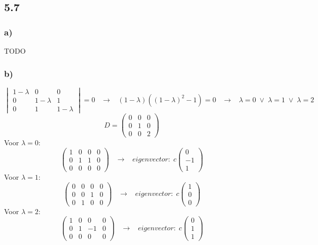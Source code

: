 \documentclass[11pt]{article}
\begin{document}
\subsection*{5.7}
\subsubsection*{a)}
TODO

\subsubsection*{b)}
\[
\begin{vmatrix}
1-\lambda & 0 & 0\\
0 & 1- \lambda & 1 \\
0 & 1 & 1-\lambda
\end{vmatrix}
=0
\;\;\;\longrightarrow\;\;\;
(1-\lambda)((1-\lambda)^2-1)=0
\;\;\;\longrightarrow\;\;\;
\lambda = 0 \;\vee\; \lambda = 1 \;\vee\; \lambda = 2
\]
\[
D = 
\begin{pmatrix}
0 & 0 & 0\\
0 & 1 & 0\\
0 & 0 & 2
\end{pmatrix}
\]
Voor $\lambda = 0$: 
\[
\left(
\begin{array}{ccc|c}
1 & 0 & 0 & 0\\
0 & 1 & 1 & 0\\
0 & 0 & 0 & 0
\end{array}
\right)
\;\;\;\longrightarrow\;\;\;
eigenvector:\;
c
\begin{pmatrix}
0\\-1\\1
\end{pmatrix}
\]
Voor $\lambda = 1$: 
\[
\left(
\begin{array}{ccc|c}
0 & 0 & 0 & 0\\
0 & 0 & 1 & 0\\
0 & 1 & 0 & 0
\end{array}
\right)
\;\;\;\longrightarrow\;\;\;
eigenvector:\;
c
\begin{pmatrix}
1\\0\\0
\end{pmatrix}
\]
Voor $\lambda = 2$: 
\[
\left(
\begin{array}{ccc|c}
1 & 0 & 0 & 0\\
0 & 1 & -1 & 0\\
0 & 0 & 0 & 0
\end{array}
\right)
\;\;\;\longrightarrow\;\;\;
eigenvector:\;
c
\begin{pmatrix}
0\\1\\1
\end{pmatrix}
\]
\end{document}
